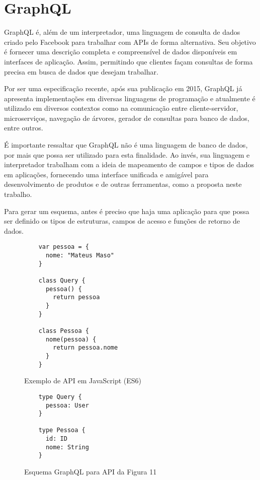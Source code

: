 \chapter{GraphQL}

GraphQL é, além de um interpretador, uma linguagem de consulta de dados criado pelo Facebook para trabalhar com APIs de forma alternativa. Seu objetivo é fornecer uma descrição completa e compreensível de dados disponíveis em interfaces de aplicação. Assim, permitindo que clientes façam consultas de forma precisa em busca de dados que desejam trabalhar. \cite{GraphQL2016}

Por ser uma especificação recente, após sua publicação em 2015, GraphQL já apresenta implementações em diversas linguagens de programação e atualmente é utilizado em diversos contextos como na comunicação entre cliente-servidor, microserviços, navegação de árvores, gerador de consultas para banco de dados, entre outros.

É importante ressaltar que GraphQL não é uma linguagem de banco de dados, por mais que possa ser utilizado para esta finalidade. Ao invés, sua linguagem e interpretador trabalham com a ideia de mapeamento de campos e tipos de dados em aplicações, fornecendo uma interface unificada e amigável para desenvolvimento de produtos e de outras ferramentas, como a proposta neste trabalho. \cite{GraphQL2016}

Para gerar um esquema, antes é preciso que haja uma aplicação para que possa ser definido os tipos de estruturas, campos de acesso e funções de retorno de dados.

\begin{figure}[H]
  \centering
  \begin{verbatim}
    var pessoa = {
      nome: "Mateus Maso"
    }

    class Query {
      pessoa() {
        return pessoa
      }
    }

    class Pessoa {
      nome(pessoa) {
        return pessoa.nome
      }
    }
  \end{verbatim}
  \caption{Exemplo de API em JavaScript (ES6)}
\end{figure}

\begin{figure}[H]
  \centering
  \begin{verbatim}
    type Query {
      pessoa: User
    }

    type Pessoa {
      id: ID
      nome: String
    }
  \end{verbatim}
  \caption{Esquema GraphQL para API da Figura 11}
\end{figure}

